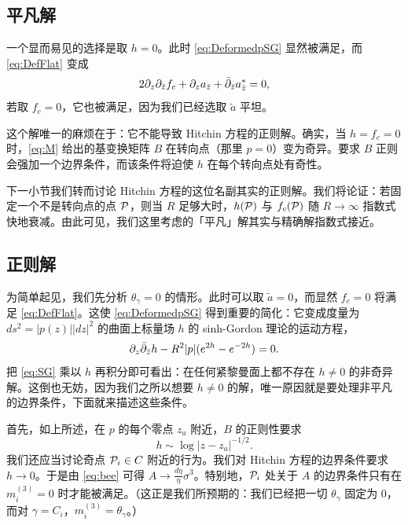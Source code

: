 \subsection{平凡解} \label{sec:trivial}

一个显而易见的选择是取 $h=0$。此时 \eqref{eq:DeformedpSG} 显然被满足，而 \eqref{eq:DefFlat} 变成
\begin{equation}\label{eq:flatreduced}
2\partial_z\partial_{\bar z}f_c + \partial_z a_{\bar z} + \bar\partial_{\bar z}a_{\bar z}^* = 0,
\end{equation}
若取 $f_c=0$，它也被满足，因为我们已经选取 $\tilde a$ 平坦。

这个解唯一的麻烦在于：它不能导致 Hitchin 方程的正则解。确实，当 $h=f_c=0$ 时，\eqref{eq:M} 给出的基变换矩阵 $B$ 在转向点（那里 $p=0$）变为奇异。要求 $B$ 正则会强加一个边界条件，而该条件将迫使 $h$ 在每个转向点处有奇性。

下一小节我们转而讨论 Hitchin 方程的这位名副其实的正则解。我们将论证：若固定一个不是转向点的点 $\mathcal{P}$，则当 $R$ 足够大时，$h(\mathcal{P})$ 与 $f_c(\mathcal{P})$ 随 $R\to\infty$ 指数式快地衰减。由此可见，我们这里考虑的「平凡」解其实与精确解指数式接近。

\subsection{正则解}

为简单起见，我们先分析 $\theta_\gamma=0$ 的情形。此时可以取 $\tilde a=0$，而显然 $f_c=0$ 将满足 \eqref{eq:DefFlat}。这使 \eqref{eq:DeformedpSG} 得到重要的简化：它变成度量为 $ds^2=|p(z)||dz|^2$ 的曲面上标量场 $h$ 的 sinh-Gordon 理论的运动方程，
\begin{equation}\label{eq:SG}
\partial_z\bar\partial_{\bar z}h - R^2|p|(e^{2h}-e^{-2h}) = 0.
\end{equation}
把 \eqref{eq:SG} 乘以 $h$ 再积分即可看出：在任何紧黎曼面上都不存在 $h\neq0$ 的非奇异解。这倒也无妨，因为我们之所以想要 $h\neq0$ 的解，唯一原因就是要处理非平凡的边界条件，下面就来描述这些条件。

首先，如上所述，在 $p$ 的每个零点 $z_a$ 附近，$B$ 的正则性要求
\begin{equation}
h \sim \log|z-z_a|^{-1/2}.
\end{equation}
我们还应当讨论奇点 $\mathcal{P}_i\in C$ 附近的行为。我们对 Hitchin 方程的边界条件要求 $h\to0$。于是由 \eqref{eq:bee} 可得 $A\to\frac{d\eta}{\eta}\sigma^3$。特别地，$\mathcal{P}_i$ 处关于 $A$ 的边界条件只有在 $m_i^{(3)}=0$ 时才能被满足。（这正是我们所预期的：我们已经把一切 $\theta_\gamma$ 固定为 $0$，而对 $\gamma=C_i$，$m_i^{(3)}=\theta_\gamma$。）

